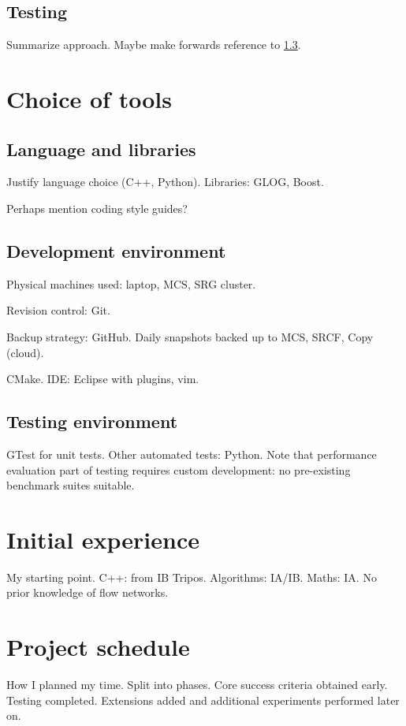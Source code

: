 \subsection{Testing}
Summarize approach. Maybe make forwards reference to \ref{sec:prep-tools-testing}.

\section{Choice of tools} \label{sec:prep-tool-choice}
\subsection{Language and libraries}
Justify language choice (C++, Python). Libraries: GLOG, Boost.

Perhaps mention coding style guides?

\subsection{Development environment}
Physical machines used: laptop, MCS, SRG cluster.

Revision control: Git.

Backup strategy: GitHub. Daily snapshots backed up to MCS, SRCF, Copy (cloud).

CMake. IDE: Eclipse with plugins, vim.

\subsection{Testing environment} \label{sec:prep-tools-testing}
GTest for unit tests. Other automated tests: Python. Note that performance evaluation part of testing requires custom development: no pre-existing benchmark suites suitable.

\section{Initial experience}
My starting point. C++: from IB Tripos. Algorithms: IA/IB. Maths: IA. No prior knowledge of flow networks.

\section{Project schedule} \label{sec:prep-project-schedule}
How I planned my time. Split into phases. Core success criteria obtained early. Testing completed. Extensions added and additional experiments performed later on.